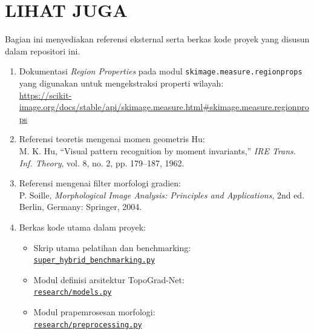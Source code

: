 \documentclass[12pt,a4paper]{article}
\begin{document}
\section*{LIHAT JUGA}
Bagian ini menyediakan referensi eksternal serta berkas kode proyek yang disusun dalam repositori ini.

\begin{enumerate}
    \item Dokumentasi \textit{Region Properties} pada modul \texttt{skimage.measure.regionprops} yang digunakan untuk mengekstraksi properti wilayah: \\
    \url{https://scikit-image.org/docs/stable/api/skimage.measure.html#skimage.measure.regionprops}
    
    \item Referensi teoretis mengenai momen geometris Hu: \\
    M. K. Hu, ``Visual pattern recognition by moment invariants,'' \textit{IRE Trans. Inf. Theory}, vol. 8, no. 2, pp. 179--187, 1962.
    
    \item Referensi mengenai filter morfologi gradien: \\
    P. Soille, \textit{Morphological Image Analysis: Principles and Applications}, 2nd ed. Berlin, Germany: Springer, 2004.
    
    \item Berkas kode utama dalam proyek:
    \begin{itemize}
        \item Skrip utama pelatihan dan benchmarking: \\
        \href{file:///C:/Users/bimyu/Documents/Projects/PACD/skeletonization_image_processing/super_hybrid_benchmarking.py}{\texttt{super\_hybrid\_benchmarking.py}}
        
        \item Modul definisi arsitektur TopoGrad-Net: \\
        \href{file:///C:/Users/bimyu/Documents/Projects/PACD/skeletonization_image_processing/research/models.py}{\texttt{research/models.py}}
        
        \item Modul prapemrosesan morfologi: \\
        \href{file:///C:/Users/bimyu/Documents/Projects/PACD/skeletonization_image_processing/research/preprocessing.py}{\texttt{research/preprocessing.py}}
    \end{itemize}
\end{enumerate}
\end{document}
